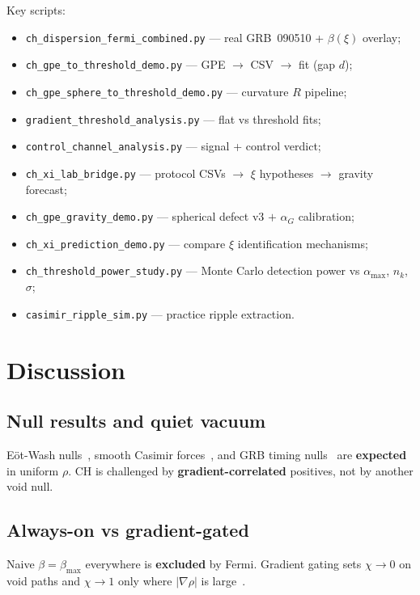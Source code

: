\documentclass[11pt,a4paper]{article}
\begin{document}
Key scripts:
\begin{itemize}[leftmargin=*]
  \item \texttt{ch\_dispersion\_fermi\_combined.py} --- real GRB~090510 + $\beta(\xi)$ overlay;
  \item \texttt{ch\_gpe\_to\_threshold\_demo.py} --- GPE $\to$ CSV $\to$ fit (gap $d$);
  \item \texttt{ch\_gpe\_sphere\_to\_threshold\_demo.py} --- curvature $R$ pipeline;
  \item \texttt{gradient\_threshold\_analysis.py} --- flat vs threshold fits;
  \item \texttt{control\_channel\_analysis.py} --- signal + control verdict;
  \item \texttt{ch\_xi\_lab\_bridge.py} --- protocol CSVs $\to$ $\xi$ hypotheses $\to$ gravity forecast;
  \item \texttt{ch\_gpe\_gravity\_demo.py} --- spherical defect v3 $+$ $\alpha_G$ calibration;
  \item \texttt{ch\_xi\_prediction\_demo.py} --- compare $\xi$ identification mechanisms;
  \item \texttt{ch\_threshold\_power\_study.py} --- Monte Carlo detection power vs $\alpha_{\max}$, $n_k$, $\sigma$;
  \item \texttt{casimir\_ripple\_sim.py} --- practice ripple extraction.
\end{itemize}

\section{Discussion}
\label{sec:discussion}

\subsection{Null results and quiet vacuum}

E\"ot-Wash nulls~\cite{Lee2020}, smooth Casimir forces~\cite{Casimir1948}, and GRB timing nulls~\cite{Abdo2009Nature,AmelinoCamelia2009} are \textbf{expected} in uniform $\rho$.
CH is challenged by \textbf{gradient-correlated} positives, not by another void null.

\subsection{Always-on vs gradient-gated}

Naive $\beta = \beta_{\max}$ everywhere is \textbf{excluded} by Fermi.
Gradient gating sets $\chi \to 0$ on void paths and $\chi \to 1$ only where $|\nabla\rho|$ is large~\cite{Volovik2003,Unruh1981}.
\end{document}
